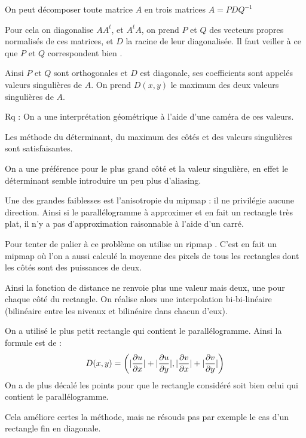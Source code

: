 On peut décomposer toute matrice $A$ en trois matrices $A = PDQ^{-1}$

Pour cela on diagonalise $AA^t$, et $A^tA$, on prend $P$ et $Q$ des vecteurs propres normalisés de ces matrices, et $D$ la racine de leur diagonalisée. Il faut veiller à ce que $P$ et $Q$ correspondent bien \cite{abdi2007singular}.

Ainsi $P$ et $Q$ sont orthogonales et $D$ est diagonale, ses coefficients sont appelés valeurs singulières de $A$. On prend $D(x,y)$ le maximum des deux valeurs singulières de $A$.

Rq : On a une interprétation géométrique à l'aide d'une caméra de ces valeurs.


Les méthode du déterminant, du maximum des côtés et des valeurs singulières sont satisfaisantes.

On a une préférence pour le plus grand côté et la valeur singulière, en effet le déterminant semble introduire un peu plus d'aliasing. 


Une des grandes faiblesses est l'anisotropie du mipmap : il ne privilégie aucune direction. Ainsi si le parallélogramme à approximer et en fait un rectangle très plat, il n'y a pas d'approximation raisonnable à l'aide d'un carré.

Pour tenter de palier à ce problème on utilise un ripmap \cite{akenine2008real}. C'est en fait un mipmap où l'on a aussi calculé la moyenne des pixels de tous les rectangles dont les côtés sont des puissances de deux.

Ainsi la fonction de distance ne renvoie plus une valeur mais deux, une pour chaque côté du rectangle. On réalise alors une interpolation bi-bi-linéaire (bilinéaire entre les niveaux et bilinéaire dans chacun d'eux).



On a utilisé le plus petit rectangle qui contient le parallélogramme. Ainsi la formule est de :
$$D(x,y) = \left( |\frac{\partial u}{\partial x}|+|\frac{\partial u}{\partial y}|,|\frac{\partial v}{\partial x}|+|\frac{\partial v}{\partial y}|\right)$$
On a de plus décalé les points pour que le rectangle considéré soit bien celui qui contient le parallélogramme.

Cela améliore certes la méthode, mais ne résouds pas par exemple le cas d'un rectangle fin en diagonale.


